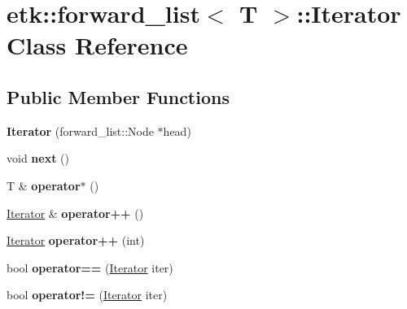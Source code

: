 \hypertarget{classetk_1_1forward__list_1_1_iterator}{\section{etk\-:\-:forward\-\_\-list$<$ T $>$\-:\-:Iterator Class Reference}
\label{classetk_1_1forward__list_1_1_iterator}
}
\subsection*{Public Member Functions}
\begin{DoxyCompactItemize}
\item 
\hypertarget{classetk_1_1forward__list_1_1_iterator_a1d1489e859832192ee112fb76a8a1a01}{{\bfseries Iterator} (forward\-\_\-list\-::\-Node $\ast$head)}\label{classetk_1_1forward__list_1_1_iterator_a1d1489e859832192ee112fb76a8a1a01}

\item 
\hypertarget{classetk_1_1forward__list_1_1_iterator_ae017a5c3be98552a834c7b1d346583f6}{void {\bfseries next} ()}\label{classetk_1_1forward__list_1_1_iterator_ae017a5c3be98552a834c7b1d346583f6}

\item 
\hypertarget{classetk_1_1forward__list_1_1_iterator_a056f99a0d3df290986a82bdf1aa14ced}{T \& {\bfseries operator$\ast$} ()}\label{classetk_1_1forward__list_1_1_iterator_a056f99a0d3df290986a82bdf1aa14ced}

\item 
\hypertarget{classetk_1_1forward__list_1_1_iterator_a2ae1c095ba91975a71c985f1477d5459}{\hyperlink{classetk_1_1forward__list_1_1_iterator}{Iterator} \& {\bfseries operator++} ()}\label{classetk_1_1forward__list_1_1_iterator_a2ae1c095ba91975a71c985f1477d5459}

\item 
\hypertarget{classetk_1_1forward__list_1_1_iterator_a40b6956568ba767c5afac54e47a156e5}{\hyperlink{classetk_1_1forward__list_1_1_iterator}{Iterator} {\bfseries operator++} (int)}\label{classetk_1_1forward__list_1_1_iterator_a40b6956568ba767c5afac54e47a156e5}

\item 
\hypertarget{classetk_1_1forward__list_1_1_iterator_a86577a0887736e2bd3bc41b407cb6df4}{bool {\bfseries operator==} (\hyperlink{classetk_1_1forward__list_1_1_iterator}{Iterator} iter)}\label{classetk_1_1forward__list_1_1_iterator_a86577a0887736e2bd3bc41b407cb6df4}

\item 
\hypertarget{classetk_1_1forward__list_1_1_iterator_ae322a1f4ea75e94942ac1b9aafbc5d8f}{bool {\bfseries operator!=} (\hyperlink{classetk_1_1forward__list_1_1_iterator}{Iterator} iter)}\label{classetk_1_1forward__list_1_1_iterator_ae322a1f4ea75e94942ac1b9aafbc5d8f}

\end{DoxyCompactItemize}
